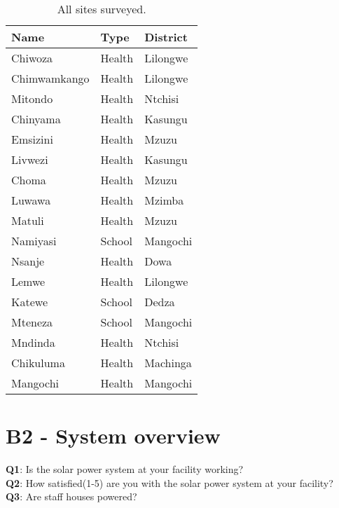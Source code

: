 \begin{table}[ht!]
\centering
    \begin{tabular}{ m{4cm} m{2.5cm} m{4cm}} 
    \toprule
    \toprule
    \textbf{Name} & \textbf{Type} & \textbf{District} \\
    \midrule
    Chiwoza   & Health    & Lilongwe  \\
    Chimwamkango   & Health & Lilongwe  \\
    Mitondo   & Health    & Ntchisi  \\
    Chinyama   & Health    & Kasungu  \\
    Emsizini   & Health    & Mzuzu  \\
    Livwezi   & Health    & Kasungu  \\
    Choma   & Health    & Mzuzu  \\
    Luwawa   & Health    & Mzimba\\
    Matuli   & Health    & Mzuzu  \\
    Namiyasi   & School    & Mangochi \\
    Nsanje   & Health    & Dowa  \\
    Lemwe   & Health    & Lilongwe  \\
    Katewe   & School    & Dedza  \\
    Mteneza   & School    & Mangochi  \\
    Mndinda   & Health    & Ntchisi  \\
    Chikuluma   & Health    & Machinga  \\
    Mangochi   & Health    & Mangochi  \\
    
    \bottomrule
    \bottomrule
    \end{tabular}
\caption[User survey- Participating sites]{All sites surveyed.}
\label{tab:us_participants}
\end{table}

\newpage
\section*{\large{B2 - System overview}}
\vspace*{1cm}

\textbf{Q1}: Is the solar power system at your facility working?\\

\noindent\textbf{Q2}: How satisfied(1-5) are you with the solar power system at your facility?\\

\noindent\textbf{Q3}: Are staff houses powered?



